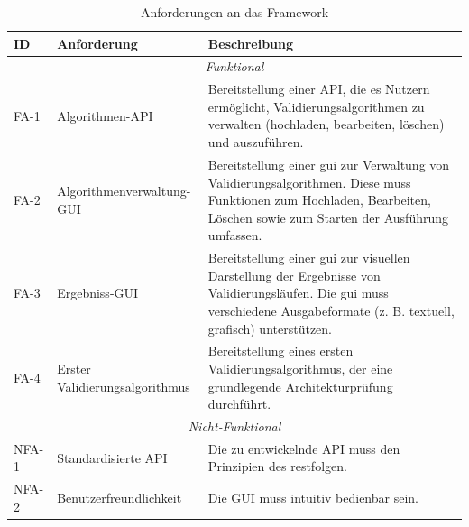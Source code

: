 \begin{table}[h!]
  \centering
  \footnotesize
  \begin{tabularx}{\textwidth}{l l X}
    \toprule
    \textbf{ID} & \textbf{Anforderung}           & \textbf{Beschreibung}                                                                                                                                                                   \\
    \midrule
    \multicolumn{3}{c}{\textit{Funktional}}                                                                                                                                                                                                \\
    \midrule
    FA-1        & Algorithmen-API                & Bereitstellung einer API, die es Nutzern ermöglicht, Validierungsalgorithmen zu verwalten (hochladen, bearbeiten, löschen) und auszuführen.                                             \\
    \midrule
    FA-2        & Algorithmenverwaltung-GUI      & Bereitstellung einer \gls{gui} zur Verwaltung von Validierungsalgorithmen. Diese muss Funktionen zum Hochladen, Bearbeiten, Löschen sowie zum Starten der Ausführung umfassen.          \\
    \midrule
    FA-3        & Ergebniss-GUI                  & Bereitstellung einer \gls{gui} zur visuellen Darstellung der Ergebnisse von Validierungsläufen. Die \gls{gui} muss verschiedene Ausgabeformate (z. B. textuell, grafisch) unterstützen. \\
    \midrule
    FA-4        & Erster Validierungsalgorithmus & Bereitstellung eines ersten Validierungsalgorithmus, der eine grundlegende Architekturprüfung durchführt.                                                                               \\
    \bottomrule
    \multicolumn{3}{c}{\textit{Nicht-Funktional}}                                                                                                                                                                                          \\
    \midrule
    NFA-1       & Standardisierte API            & Die zu entwickelnde API muss den Prinzipien des \gls{rest}folgen.                                                                                                                       \\
    \midrule
    NFA-2       & Benutzerfreundlichkeit         & Die GUI muss intuitiv bedienbar sein.                                                                                                                                                   \\
    \bottomrule
  \end{tabularx}
  \caption{Anforderungen an das Framework}
  \label{tab:anforderungen}
\end{table}

